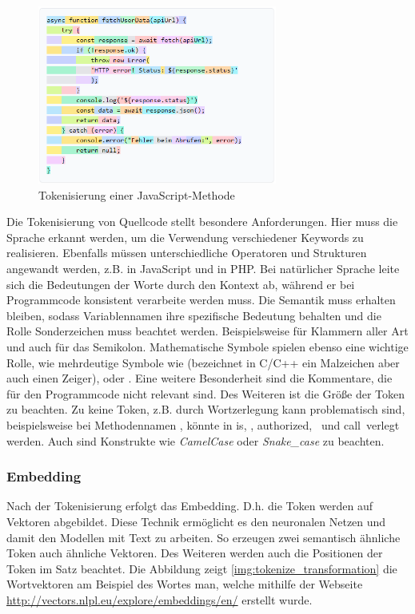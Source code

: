 \begin{center}
	\begin{figure}[!ht]
		\includegraphics[width=0.7\textwidth]{content/chapter_basics/images/tokenize.png}
		\centering
		\caption{Tokenisierung einer JavaScript-Methode}
		\label{img:tokenize_javascript_method}
	\end{figure}
\end{center}

Die Tokenisierung von Quellcode stellt besondere Anforderungen. Hier muss die Sprache erkannt werden, um die Verwendung verschiedener Keywords zu realisieren. Ebenfalls müssen unterschiedliche Operatoren und Strukturen angewandt werden, z.B. \code{===} in JavaScript und \code{::} in PHP. Bei natürlicher Sprache leite sich die Bedeutungen der Worte durch den Kontext ab, während er bei Programmcode konsistent verarbeite werden muss. Die Semantik muss erhalten bleiben, sodass Variablennamen ihre spezifische Bedeutung behalten und die Rolle Sonderzeichen muss beachtet werden. Beispielsweise für Klammern aller Art und auch für das Semikolon. Mathematische Symbole spielen ebenso eine wichtige Rolle, wie mehrdeutige Symbole wie \code{*} (bezeichnet in C/C++ ein Malzeichen aber auch einen Zeiger), \code{\&} oder \code{|}. Eine weitere Besonderheit sind die Kommentare, die für den Programmcode nicht relevant sind. Des Weiteren ist die Größe der Token zu beachten. Zu keine Token, z.B. durch Wortzerlegung kann problematisch sind, beispielsweise bei Methodennamen , könnte in \grqq is\grqq, \grqq \grqq, \grqq authorized\grqq, \grqq \grqq \ und \grqq call\grqq \ verlegt werden. Auch sind Konstrukte wie \textit{CamelCase} oder \textit{Snake\_case} zu beachten.

\subsubsection{Embedding}
Nach der Tokenisierung erfolgt das Embedding. D.h. die Token werden auf Vektoren abgebildet. Diese Technik ermöglicht es den neuronalen Netzen und damit den Modellen mit Text zu arbeiten. So erzeugen zwei semantisch ähnliche Token auch ähnliche Vektoren. Des Weiteren werden auch die Positionen der Token im Satz beachtet. Die Abbildung zeigt \ref{img:tokenize_transformation} die Wortvektoren am Beispiel des Wortes \glqq man\grqq, welche mithilfe der Webseite \href{http://vectors.nlpl.eu/explore/embeddings/en/}{http://vectors.nlpl.eu/explore/embeddings/en/} erstellt wurde.

